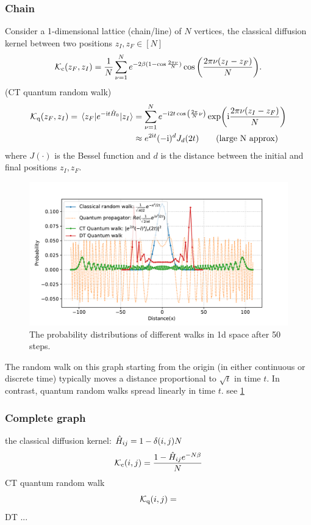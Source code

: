 \subsubsection{Chain}
Consider a 1-dimensional lattice (chain/line) of $N$ vertices,
the classical diffusion kernel between two positions $z_I,z_F\in [N]$
\begin{equation}
	\mathcal{K}_{\textup{c}}(z_F,z_I) = \frac{1}{N}  
	\sum_{\nu=1}^{N} e^{-2\beta(1-\cos\frac{2\pi \nu}{N})} 
	\cos\qty(\frac{2\pi\nu(z_I-z_F)}{N}).
\end{equation}
 (CT quantum random walk)
\begin{align}
	\mathcal{K}_{\textup{q}}(z_F,z_I) = 
	\mel{z_F}{e^{-\textup{i}t\hat{H}_0 }}{z_I}
	&=\sum_{\nu=1}^{N} 
	e^{-\textup{i} 2t \cos\qty(\frac{2\pi}{N}\nu)} 
	\exp(\textup{i} \frac{2\pi \nu(z_I-z_F)}{N})
	\\
	&
	\approx e^{2\textup{i} t} (-\textup{i})^{d} J_{d} (2t)
	\tag{large N approx}
	\label{eq:ctqrw_kernel}
\end{align}
where $J(\cdot)$ is the Bessel function and $d$ is the distance between the initial and final positions $z_I,z_F$.
\begin{figure}[!ht]
	\centering
	\includegraphics[width=.7\linewidth]{walk_propagator_1d.pdf}
	\caption{The probability distributions of different walks in 1d space after 50 steps.}
	\label{fig:random_walks}
\end{figure}
\begin{remark}
    The random walk on this graph starting from the origin (in either continuous or discrete time)
    typically moves a distance proportional to $\sqrt{t}$ in time $t$.
	In contrast, quantum random walks spread linearly in time $t$.
	see \cref{fig:random_walks}
\end{remark}

\subsubsection{Complete graph}
the classical diffusion kernel:
$\hat{H}_{ij}=1-\delta(i,j)N$
\begin{equation}
	\mathcal{K}_{\textup{c}} (i,j) = 
	\frac{1-\hat{H}_{ij} e^{-N\beta }}{N}
\end{equation}
CT quantum random walk
\begin{equation}
	\mathcal{K}_{\textup{q}} (i,j) = 
\end{equation}
DT ...

